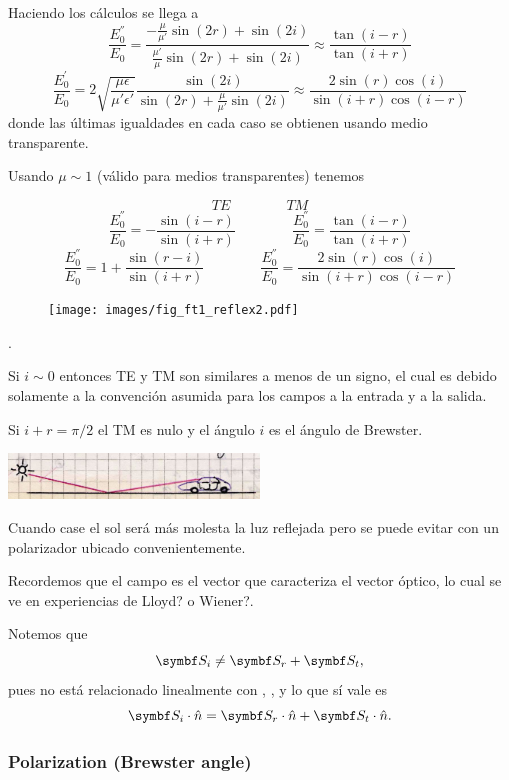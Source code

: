 \documentclass[10pt,oneside]{CBFT_book}
\begin{document}
Haciendo los cálculos se llega a
\[
	\frac{E_0^{''}}{E_0} = \frac{ -\frac{\mu}{\mu'} \sin(2r) + \sin(2i) }
	{ \frac{\mu'}{\mu} \sin(2r) + \sin(2i) } 
	\approx \frac{ \tan(i-r)}{\tan(i+r)}
\]
\[
	\frac{E_0^{'}}{E_0} = 2 \sqrt{ \frac{\mu\epsilon}{\mu'\epsilon'} }
	\frac{ \sin( 2i ) }{ \sin(2r) + \frac{\mu}{\mu'}\sin(2i) }
	\approx \frac{ 2 \sin(r) \cos( i) }{\sin(i+r) \cos(i-r) }
\]
donde las últimas igualdades en cada caso se obtienen usando medio transparente.

Usando $\mu \sim 1$ (válido para medios transparentes) tenemos

\[
	TE \qquad \qquad TM
\]
\[
	\frac{E_0^{''}}{E_0} = -\frac{\sin(i-r)}{\sin(i+r)} \qquad \qquad 
	\frac{E_0^{''}}{E_0} = \frac{\tan(i-r)}{\tan(i+r)} 
\]
\[
	\frac{E_0^{''}}{E_0} = 1 + \frac{\sin(r-i)}{\sin(i+r)} \qquad \qquad 
	\frac{E_0^{''}}{E_0} = \frac{2 \sin(r)\cos(i)}{\sin(i+r)\cos(i-r)} 
\]
\begin{figure}[htb]
	\begin{center}
	\texttt{[image: images/fig\_ft1\_reflex2.pdf]} 
	\end{center}
	\caption{}
\end{figure} 

.

Si $i \sim 0$ entonces TE y TM son similares a menos de un signo, el cual es debido
solamente a la convención asumida para los campos a la entrada y a la salida.

Si $i+r = \pi/2$ el TM es nulo y el ángulo $i$ es el ángulo de Brewster.

\includegraphics[width=0.5\textwidth]{images/fig_ft1_ondas_autete.jpg} 

Cuando case el sol será más molesta la luz reflejada pero se puede evitar con un
polarizador ubicado convenientemente.

Recordemos que el campo  es el vector que caracteriza el vector óptico, lo cual
se ve en experiencias de Lloyd? o Wiener?.

Notemos que  
\[
	\vb{S}_i \neq \vb{S}_r + \vb{S}_t ,
\]
pues  no está relacionado linealmente con , , y lo que sí vale es
\[
	\vb{S}_i \cdot \hat{n} = \vb{S}_r \cdot \hat{n} + \vb{S}_t \cdot \hat{n}.
\]

\subsubsection{Polarization (Brewster angle)}
\end{document}
